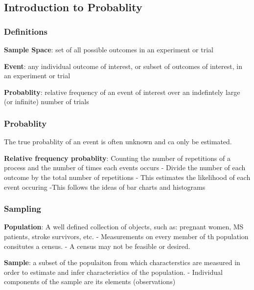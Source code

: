 \documentclass[12pt,]{article}
\begin{document}
\hypertarget{htmlwidget-ed9edf15c1db7eeb758a}{}

\hypertarget{introduction-to-probablity}{%
\subsection{Introduction to
Probablity}\label{introduction-to-probablity}}

\hypertarget{definitions}{%
\subsubsection{Definitions}\label{definitions}}

\textbf{Sample Space}: set of all possible outcomes in an experiment or
trial

\textbf{Event}: any individual outcome of interest, or subset of
outcomes of interest, in an experiment or trial

\textbf{Probablity}: relative frequency of an event of interest over an
indefintely large (or infinite) number of trials

\hypertarget{probablity}{%
\subsubsection{Probablity}\label{probablity}}

The true probablity of an event is often unknown and ca only be
estimated.

\textbf{Relative frequency probablity}: Counting the number of
repetitions of a process and the number of times each events occurs -
Divide the number of each outcome by the total number of repetitions -
This estimates the likelihood of each event occuring -This follows the
ideas of bar charts and histograms

\hypertarget{sampling}{%
\subsubsection{Sampling}\label{sampling}}

\textbf{Population}: A well defined collection of objects, such as:
pregnant women, MS patients, stroke survivors, etc. - Measurements on
every member of th population consitutes a census. - A census may not be
feasible or desired.

\textbf{Sample}: a subset of the populaiton from which characterstics
are measured in order to estimate and infer characteristics of the
population. - Individual components of the sample are its elements
(observations)
\end{document}
